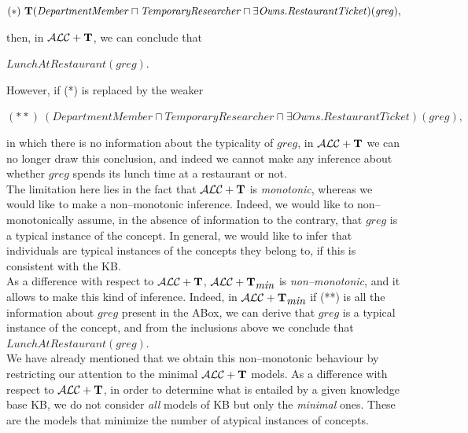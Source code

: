 \documentclass[a4paper, 11pt, oneside]{duthesis}
\newcommand{\tip}{{\bf T}}
\newcommand{\alct}{\mathcal{ALC}+\tip}
\newcommand{\alctmin}{\mathcal{ALC}+\tip_{\mbox{\em min}}}
\begin{document}
\begin{center}$(*)  \ \tip(\mathit{DepartmentMember} \sqcap \mathit{TemporaryResearcher} \sqcap \exists \mathit{Owns}.\mathit{RestaurantTicket})(\mathit{greg}),$\end{center}


\noindent then, in $\alct$, we can conclude that

\begin{center}$\mathit{LunchAtRestaurant(\mathit{greg})}.$\end{center}

\noindent However, if (*) is replaced by the weaker
\begin{center} $(**)  \ (\mathit{DepartmentMember} \sqcap \mathit{TemporaryResearcher} \sqcap \exists \mathit{Owns}.\mathit{RestaurantTicket})(\mathit{greg}),$ \end{center}

in which there is no information about the typicality of $\mathit{greg}$, in $\alct$ we can no longer draw this conclusion, and indeed we cannot make any inference about whether $\mathit{greg}$ spends its lunch time at a restaurant or not.\\

The limitation here lies in the fact that $\alct$ is {\em monotonic}, whereas we would like to make a non--monotonic inference.
Indeed, we would like to non--monotonically assume, in the absence of information to the contrary, that $\mathit{greg}$ is a typical instance of the concept.
In general, we would like to infer that individuals are typical instances of the concepts they belong to, if this is consistent with the KB.\\

As a difference with respect to $\alct$, $\alctmin$ is {\em non--monotonic}, and it allows to make this kind of inference.
Indeed, in $\alctmin$ if (**) is all the information about $\mathit{greg}$ present in the ABox, we can derive that $\mathit{greg}$ is a typical instance of the concept, and from the inclusions above we conclude that $\mathit{LunchAtRestaurant(\mathit{greg})}.$\\

We have already mentioned that we obtain this non--monotonic behaviour by restricting our attention to the  minimal $\alct$ models.
As a difference with respect to $\alct$, in order to determine what is entailed by a given knowledge base KB, we do not consider {\em all} models of KB but only the {\em minimal} ones.
These are the models that minimize the number of atypical instances of concepts.\\
\end{document}
